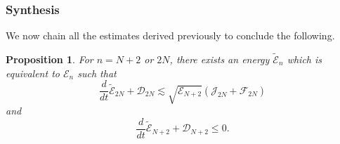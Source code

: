 \documentclass[a4paper,reqno,11pt]{amsart}
\numberwithin{equation}{section}
\providecommand{\se}[1]{\mathcal{E}_{#1}}
\newtheorem{prop}[lem]{Proposition}
\begin{document}
\subsubsection{Synthesis}

We now chain all the estimates derived previously to conclude the following.
\begin{prop}
For $n=N+2$ or $2N$, there exists an  energy $\tilde{ \mathcal{E}}_{n}$ which is equivalent to $\mathcal{E}_{n}$ such that
\begin{equation}\label{sys2n}
\frac{d}{dt}\tilde{ \mathcal{E}}_{2N}+ {\mathcal{D}}_{2N}  {\lesssim}     \sqrt{ \se{N+2}  }(  \mathcal{J}_{2N} +{\mathcal{F}_{2N}})
\end{equation}
and
\begin{equation}\label{sysn+2}
\frac{d}{dt}\tilde{ \mathcal{E}}_{N+2}+ {\mathcal{D}}_{N+2}  \le 0.
\end{equation}
\end{prop}
\end{document}

